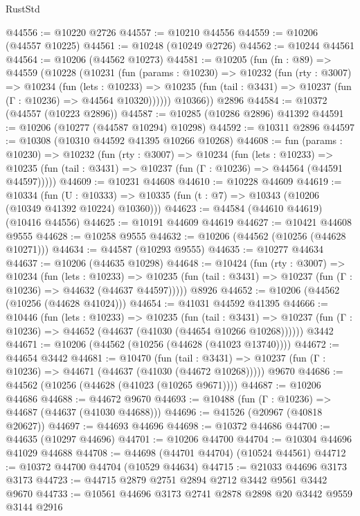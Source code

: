 \begin{lexlean}{RustStd}
\begin{coremodule}
@44556 := @10220 @2726
@44557 := @10210 @44556
@44559 := @10206 (@44557 @10225)
@44561 := @10248 (@10249 @2726)
@44562 := @10244 @44561
@44564 := @10206 (@44562 @10273)
@44581 := @10205
    (fun (fn : @89) =>
    @44559
      (@10228
        (@10231
          (fun (params : @10230) =>
          @10232
            (fun (rty : @3007) =>
            @10234
              (fun (lets : @10233) =>
              @10235 (fun (tail : @3431) => @10237 (fun (Γ : @10236) => @44564 @10320))))))
        @10366))
    @2896
@44584 := @10372 (@44557 (@10223 @2896))
@44587 := @10285 (@10286 @2896) @41392
@44591 := @10206 (@10277 (@44587 @10294) @10298)
@44592 := @10311 @2896
@44597 := @10308 (@10310 @44592 @41395 @10266 @10268)
@44608 := fun (params : @10230) =>
  @10232
    (fun (rty : @3007) =>
    @10234
      (fun (lets : @10233) =>
      @10235 (fun (tail : @3431) => @10237 (fun (Γ : @10236) => @44564 (@44591 @44597)))))
@44609 := @10231 @44608
@44610 := @10228 @44609
@44619 := @10334
    (fun (U : @10333) => @10335 (fun (t : @7) => @10343 (@10206 (@10349 @41392 @10224) @10360)))
@44623 := @44584 (@44610 @44619) (@10416 @44556)
@44625 := @10191 @44609 @44619
@44627 := @10421 @44608 @9555
@44628 := @10258 @9555
@44632 := @10206 (@44562 (@10256 (@44628 @10271)))
@44634 := @44587 (@10293 @9555)
@44635 := @10277 @44634
@44637 := @10206 (@44635 @10298)
@44648 := @10424
    (fun (rty : @3007) =>
    @10234
      (fun (lets : @10233) =>
      @10235 (fun (tail : @3431) => @10237 (fun (Γ : @10236) => @44632 (@44637 @44597)))))
    @8926
@44652 := @10206 (@44562 (@10256 (@44628 @41024)))
@44654 := @41031 @44592 @41395
@44666 := @10446
    (fun (lets : @10233) =>
    @10235
      (fun (tail : @3431) =>
      @10237 (fun (Γ : @10236) => @44652 (@44637 (@41030 (@44654 @10266 @10268))))))
    @3442
@44671 := @10206 (@44562 (@10256 (@44628 (@41023 @13740))))
@44672 := @44654 @3442
@44681 := @10470
    (fun (tail : @3431) => @10237 (fun (Γ : @10236) => @44671 (@44637 (@41030 (@44672 @10268)))))
    @9670
@44686 := @44562 (@10256 (@44628 (@41023 (@10265 @9671))))
@44687 := @10206 @44686
@44688 := @44672 @9670
@44693 := @10488 (fun (Γ : @10236) => @44687 (@44637 (@41030 @44688)))
@44696 := @41526 (@20967 (@40818 @20627))
@44697 := @44693 @44696
@44698 := @10372 @44686
@44700 := @44635 (@10297 @44696)
@44701 := @10206 @44700
@44704 := @10304 @44696 @41029 @44688
@44708 := @44698 (@44701 @44704) (@10524 @44561)
@44712 := @10372 @44700 @44704 (@10529 @44634)
@44715 := @21033 @44696 @3173 @3173
@44723 := @44715 @2879 @2751 @2894 @2712 @3442 @9561 @3442 @9670
@44733 := @10561 @44696 @3173 @2741 @2878 @2898 @20 @3442 @9559 @3144 @2916

\end{coremodule}
\end{lexlean}
